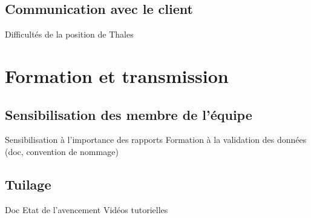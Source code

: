 \subsection{Communication avec le client}
Difficultés de la position de Thales


\section{Formation et transmission}
\subsection{Sensibilisation des membre de l'équipe }
Sensibilisation à l'importance des rapports
Formation à la validation des données (doc, convention de nommage)
\subsection{Tuilage}
Doc
Etat de l'avencement
Vidéos tutorielles


